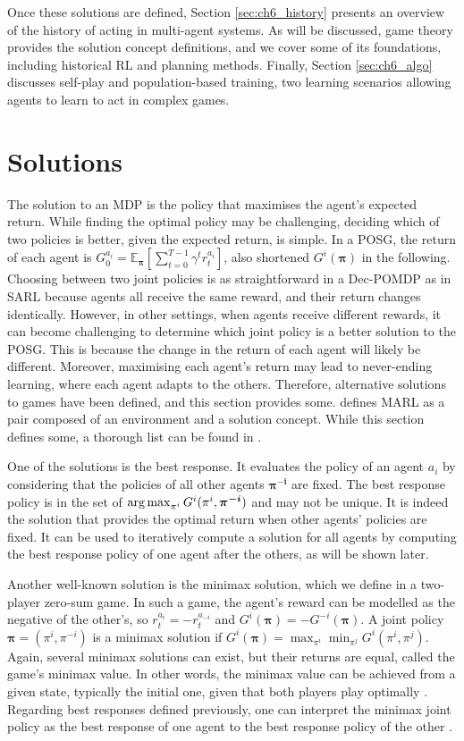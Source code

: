 Once these solutions are defined, Section \ref{sec:ch6_history} presents an overview of the history of acting in multi-agent systems.
As will be discussed, game theory provides the solution concept definitions, and we cover some of its foundations, including historical RL and planning methods.
Finally, Section \ref{sec:ch6_algo} discusses self-play and population-based training, two learning scenarios allowing agents to learn to act in complex games.

\section{Solutions}\label{sec:ch6_solutions}
The solution to an MDP is the policy that maximises the agent's expected return.
While finding the optimal policy may be challenging, deciding which of two policies is better, given the expected return, is simple.
In a POSG, the return of each agent is $G_0^{a_i} = \mathbb{E}_{\mathbf{\pi}}\left[ \sum_{t=0}^{T-1} \gamma^t r^{a_i}_t \right]$, also shortened $G^i(\mathbf{\pi})$ in the following.
Choosing between two joint policies is as straightforward in a Dec-POMDP as in SARL because agents all receive the same reward, and their return changes identically.
However, in other settings, when agents receive different rewards, it can become challenging to determine which joint policy is a better solution to the POSG.
This is because the change in the return of each agent will likely be different.
Moreover, maximising each agent's return may lead to never-ending learning, where each agent adapts to the others.
Therefore, alternative solutions to games have been defined, and this section provides some.
\cite{marl-book} defines MARL as a pair composed of an environment and a solution concept.
While this section defines some, a thorough list can be found in \citep{marl-book}.

One of the solutions is the best response.
It evaluates the policy of an agent $a_i$ by considering that the policies of all other agents $\mathbf{\pi^{-i}}$ are fixed.
The best response policy is in the set of $\argmax_{\pi^{i}} G^i (\pi^{i}, \mathbf{\pi^{-i}})$ and may not be unique.
It is indeed the solution that provides the optimal return when other agents' policies are fixed.
It can be used to iteratively compute a solution for all agents by computing the best response policy of one agent after the others, as will be shown later.

Another well-known solution is the minimax solution, which we define in a two-player zero-sum game.
In such a game, the agent's reward can be modelled as the negative of the other's, so $r_t^{a_i} = -r_t^{a_{-i}}$ and $G^i(\mathbf{\pi}) = - G^{-i}(\mathbf{\pi})$.
A joint policy $\mathbf{\pi} = (\pi^i, \pi^{-i})$ is a minimax solution if $G^i(\mathbf{\pi})=\max_{\pi^i} \min_{\pi^j} G^i(\pi^i, \pi^j)$.
Again, several minimax solutions can exist, but their returns are equal, called the game's minimax value.
In other words, the minimax value can be achieved from a given state, typically the initial one, given that both players play optimally \citep{russel2010}.
Regarding best responses defined previously, one can interpret the minimax joint policy as the best response of one agent to the best response policy of the other \citep{marl-book}.

